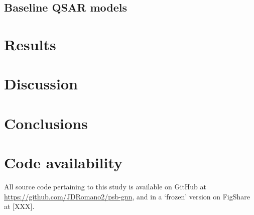 \documentclass{ws-procs11x85}
\begin{document}
\subsection{Baseline QSAR models}

\section{Results}

\section{Discussion}

\section{Conclusions}

\section{Code availability}
All source code pertaining to this study is available on GitHub at \url{https://github.com/JDRomano2/psb-gnn}, and in a `frozen' version on FigShare at [XXX].



\end{document}
